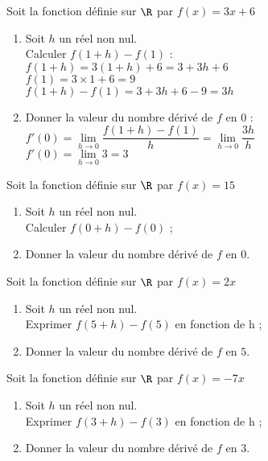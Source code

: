 \documentclass[11pt]{article}
\begin{document}
\begin{exercice}
Soit la fonction définie sur $\R$ par $f(x)=3x+6$
\begin{enumerate}
\item Soit $h$ un réel non nul. \\
Calculer $f(1+h)-f(1)$ : \\
$f(1+h) = 3(1+h)+6 = 3+3h+6$ \\
$f(1)=3 \times 1 + 6 = 9$ \\
$f(1+h)-f(1)=3+3h+6-9=3h$
\item Donner la valeur du nombre dérivé de $f$ en $0$ : \\
$f'(0)=\lim\limits_{h\to0}\dfrac{f(1+h)-f(1)}{h}=\lim\limits_{h\to0}\dfrac{3h}{h}$ \\
$f'(0)=\lim\limits_{h\to0}3=3$
\end{enumerate}
\end{exercice}

\begin{exercice}
Soit la fonction définie sur $\R$ par $f(x)=15$
\begin{enumerate}
\item Soit $h$ un réel non nul. \\
Calculer $f(0+h)-f(0)$ ;
\item Donner la valeur du nombre dérivé de $f$ en $0$.
\end{enumerate}
\end{exercice}

\begin{exercice}
Soit la fonction définie sur $\R$ par $f(x)=2x$
\begin{enumerate}
\item Soit $h$ un réel non nul. \\
Exprimer $f(5+h)-f(5)$ en fonction de h ;
\item Donner la valeur du nombre dérivé de $f$ en $5$.
\end{enumerate}
\end{exercice}

\begin{exercice}
Soit la fonction définie sur $\R$ par $f(x)=-7x$
\begin{enumerate}
\item Soit $h$ un réel non nul. \\
Exprimer $f(3+h)-f(3)$ en fonction de h ;
\item Donner la valeur du nombre dérivé de $f$ en $3$.
\end{enumerate}
\end{exercice}
\end{document}
